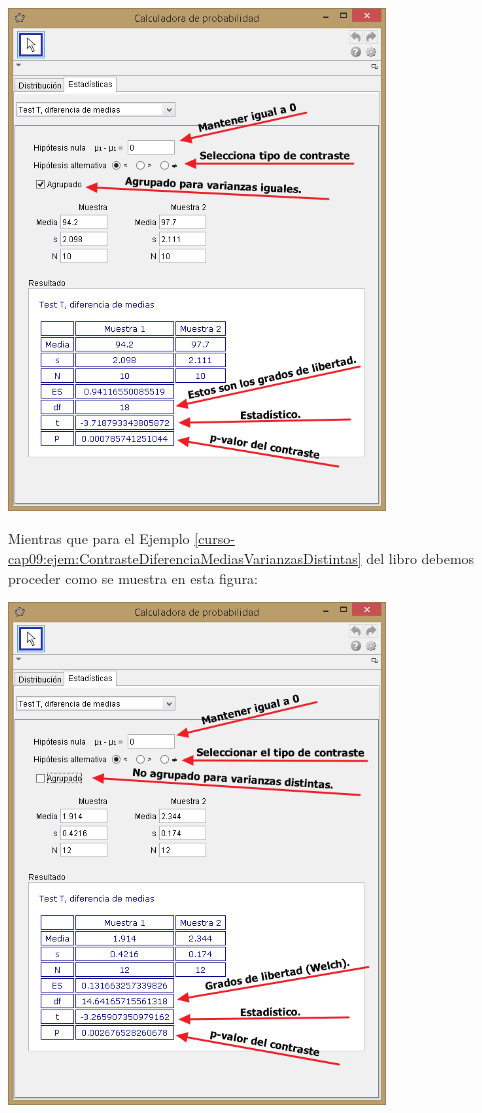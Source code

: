 \documentclass[10pt,a4paper]{article}\usepackage[]{graphicx}\usepackage[]{color}
\begin{document}
\begin{center}
    \includegraphics[width=10cm]{../fig/Tut09-05.png}
\end{center}

Mientras que para el Ejemplo \ref{curso-cap09:ejem:ContrasteDiferenciaMediasVarianzasDistintas} del libro debemos proceder como se muestra en esta figura:

\begin{center}
    \includegraphics[width=10cm]{../fig/Tut09-06.png}
\end{center}
\end{document}
